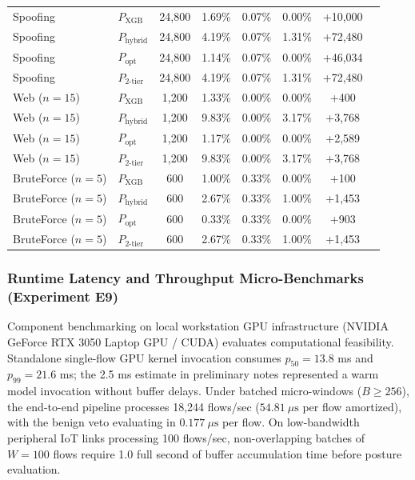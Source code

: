 \documentclass[journal,10pt,onecolumn]{IEEEtran}
\begin{document}
\begin{table}[t]
\begin{tabular}{llcccccc}
\midrule
Spoofing & $P_{\text{XGB}}$ & 24,800 & 1.69\% & 0.07\% & 0.00\% & +10,000 \\
Spoofing & $P_{\text{hybrid}}$ & 24,800 & 4.19\% & 0.07\% & 1.31\% & +72,480 \\
Spoofing & $P_{\text{opt}}$ & 24,800 & 1.14\% & 0.07\% & 0.00\% & +46,034 \\
Spoofing & $P_{2\text{-tier}}$ & 24,800 & 4.19\% & 0.07\% & 1.31\% & +72,480 \\
\midrule
Web ($n=15$) & $P_{\text{XGB}}$ & 1,200 & 1.33\% & 0.00\% & 0.00\% & +400 \\
Web ($n=15$) & $P_{\text{hybrid}}$ & 1,200 & 9.83\% & 0.00\% & 3.17\% & +3,768 \\
Web ($n=15$) & $P_{\text{opt}}$ & 1,200 & 1.17\% & 0.00\% & 0.00\% & +2,589 \\
Web ($n=15$) & $P_{2\text{-tier}}$ & 1,200 & 9.83\% & 0.00\% & 3.17\% & +3,768 \\
\midrule
BruteForce ($n=5$) & $P_{\text{XGB}}$ & 600 & 1.00\% & 0.33\% & 0.00\% & +100 \\
BruteForce ($n=5$) & $P_{\text{hybrid}}$ & 600 & 2.67\% & 0.33\% & 1.00\% & +1,453 \\
BruteForce ($n=5$) & $P_{\text{opt}}$ & 600 & 0.33\% & 0.33\% & 0.00\% & +903 \\
BruteForce ($n=5$) & $P_{2\text{-tier}}$ & 600 & 2.67\% & 0.33\% & 1.00\% & +1,453 \\
\bottomrule
\end{tabular}
\end{table}

\subsubsection{Runtime Latency and Throughput Micro-Benchmarks (Experiment E9)}
Component benchmarking on local workstation GPU infrastructure (NVIDIA GeForce RTX 3050 Laptop GPU / CUDA) evaluates computational feasibility. Standalone single-flow GPU kernel invocation consumes $p_{50} = 13.8$ ms and $p_{99} = 21.6$ ms; the 2.5 ms estimate in preliminary notes represented a warm model invocation without buffer delays. Under batched micro-windows ($B \ge 256$), the end-to-end pipeline processes 18,244 flows/sec ($54.81 \ \mu\text{s}$ per flow amortized), with the benign veto evaluating in $0.177 \ \mu\text{s}$ per flow. On low-bandwidth peripheral IoT links processing 100 flows/sec, non-overlapping batches of $W = 100$ flows require 1.0 full second of buffer accumulation time before posture evaluation.
\end{document}
